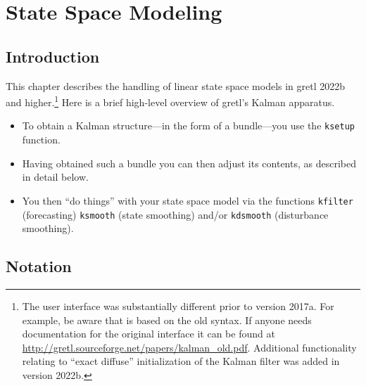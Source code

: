 \newcommand{\obsvec}{y}
\newcommand{\obsymat}{Z}
\newcommand{\obsx}{x}
\newcommand{\obsxmat}{B}
\newcommand{\obsdist}{\varepsilon}
\newcommand{\obsvar}{\Sigma}
\newcommand{\obsdim}{n}

\newcommand{\statevec}{\alpha}
\newcommand{\statecvar}{P}
\newcommand{\statemat}{T}
\newcommand{\stdist}{\eta}
\newcommand{\statevar}{\Omega}
\newcommand{\gain}{K}
\newcommand{\statemu}{\mu}
\newcommand{\stdim}{r}

\newcommand{\altstatevar}{H}
\newcommand{\altobsvar}{G}
\newcommand{\alldist}{\nu}
\newcommand{\alldim}{p}

\newcommand{\prederr}{v}
\newcommand{\predvar}{F}

\newcommand{\myvec}{\mbox{vec}}
\newcommand{\myvech}{\mbox{vech}}

\chapter{State Space Modeling}
\label{chap:kalman}

\section{Introduction}
\label{sec:amble}

This chapter describes the handling of linear state space models in
gretl 2022b and higher.\footnote{The user interface was substantially
  different prior to version 2017a.  For example, be aware that
  \cite{lucchetti11} is based on the old syntax. If anyone needs
  documentation for the original interface it can be found at
  \url{http://gretl.sourceforge.net/papers/kalman_old.pdf}. Additional
  functionality relating to ``exact diffuse'' initialization of the
  Kalman filter was added in version 2022b.} Here is a brief
high-level overview of gretl's Kalman apparatus.
%
\begin{itemize}
\item To obtain a Kalman structure---in the form of a bundle---you use
  the \texttt{ksetup} function.
\item Having obtained such a bundle you can then adjust its contents,
  as described in detail below.
\item You then ``do things'' with your state space model via the
  functions \texttt{kfilter} (forecasting) \texttt{ksmooth} (state
  smoothing) and/or \texttt{kdsmooth} (disturbance smoothing).
\end{itemize}

\section{Notation}
\label{sec:notation}

